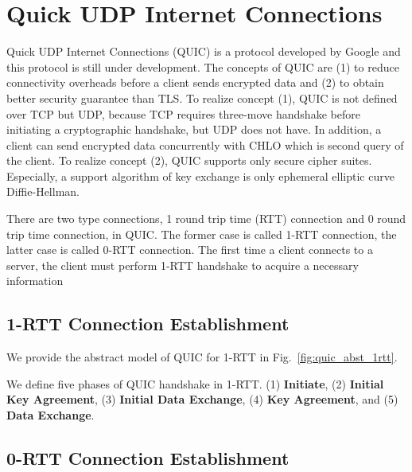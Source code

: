 \section{Quick UDP Internet Connections} \label{sec:quic}

Quick UDP Internet Connections (QUIC) is a protocol
developed by Google and this protocol is still under
development.
The concepts of QUIC are (1) to reduce connectivity
overheads before a client sends encrypted data and
(2) to obtain better security guarantee than TLS.
To realize concept (1), QUIC is not defined over
TCP but UDP, because TCP requires three-move handshake
before initiating a cryptographic handshake, but UDP
does not have. In addition, a client can send encrypted
data concurrently with CHLO which is second query of the
client.
To realize concept (2), QUIC supports only secure cipher
suites. Especially, a support algorithm of key exchange
is only ephemeral elliptic curve Diffie-Hellman.

There are two type connections, 1 round trip time (RTT)
connection and 0 round trip time connection, in QUIC.
The former case is called 1-RTT connection, the latter
case is called 0-RTT connection.
The first time a client connects to a server, the client
must perform 1-RTT handshake to acquire a necessary
information

\subsection{1-RTT Connection Establishment} \label{sec:quic_1rtt}

We provide the abstract model of QUIC for 1-RTT in
Fig.~\ref{fig:quic_abst_1rtt}.
%

%
We define five phases of QUIC handshake in 1-RTT.
(1) \textbf{Initiate},
(2) \textbf{Initial Key Agreement},
(3) \textbf{Initial Data Exchange},
(4) \textbf{Key Agreement}, and
(5) \textbf{Data Exchange}.







\subsection{0-RTT Connection Establishment} \label{sec:quic_0rtt}

